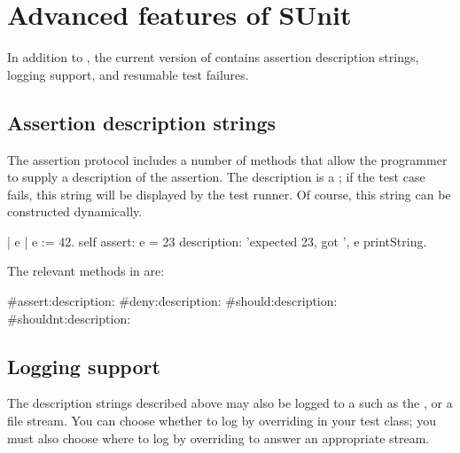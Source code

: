 \documentclass[a4paper,10pt,twoside]{book}
\begin{document}




\section{Advanced features of SUnit}
In addition to , the current version of \sunit contains assertion description strings, logging support, and resumable test failures.

\subsection{Assertion description strings}
\label{sec:descriptionStrings}

The  assertion protocol includes a number of methods that allow the programmer to supply a description of the assertion.
The description is a ; if the test case fails, this string will be displayed by the test runner.
Of course, this string can be constructed dynamically.
\begin{code}{}
| e |
e := 42.
self 
  assert: e = 23
  description: 'expected 23, got ', e printString.
\end{code}

The relevant methods in  are:
\begin{code}{}
#assert:description:
#deny:description:
#should:description:
#shouldnt:description:
\end{code}

\subsection{Logging support}
The description strings described above may also be logged to a  such as the , or a file stream.
You can choose whether to log by overriding  in your test class; you must also choose where to log by overriding  to answer an appropriate stream.
\end{document}
